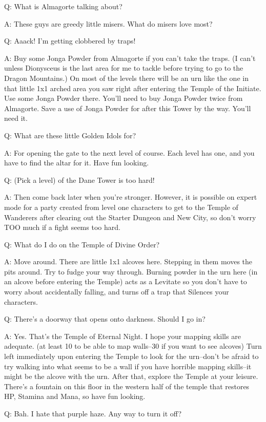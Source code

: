 \documentclass[12pt]{article}
\begin{document}
Q: What is Almagorte talking about?

A: These guys are greedy little misers. What do misers love most?

Q: Aaack! I'm getting clobbered by traps!

A: Buy some Jonga Powder from Almagorte if you can't take the traps. (I
can't unless Dionysceus is the last area for me to tackle before trying
to go to the Dragon Mountains.) On most of the levels there will be an
urn like the one in that little 1x1 arched area you saw right after
entering the Temple of the Initiate. Use some Jonga Powder there. You'll
need to buy Jonga Powder twice from Almagorte. Save a use of Jonga
Powder for after this Tower by the way. You'll need it.

Q: What are these little Golden Idols for?

A: For opening the gate to the next level of course. Each level has one,
and you have to find the altar for it. Have fun looking.

Q: (Pick a level) of the Dane Tower is too hard!

A: Then come back later when you're stronger. However, it is possible on
expert mode for a party created from level one characters to get to the
Temple of Wanderers after clearing out the Starter Dungeon and New City,
so don't worry TOO much if a fight seems too hard.

Q: What do I do on the Temple of Divine Order?

A: Move around. There are little 1x1 alcoves here. Stepping in them
moves the pits around. Try to fudge your way through. Burning powder in
the urn here (in an alcove before entering the Temple) acts as a
Levitate so you don't have to worry about accidentally falling, and
turns off a trap that Silences your characters.

Q: There's a doorway that opens onto darkness. Should I go in?

A: Yes. That's the Temple of Eternal Night. I hope your mapping skills
are adequate. (at least 10 to be able to map walls--30 if you want to
see alcoves) Turn left immediately upon entering the Temple to look for
the urn--don't be afraid to try walking into what seems to be a wall if
you have horrible mapping skills--it might be the alcove with the urn.
After that, explore the Temple at your leisure. There's a fountain on
this floor in the western half of the temple that restores HP, Stamina
and Mana, so have fun looking.

Q: Bah. I hate that purple haze. Any way to turn it off?
\end{document}
